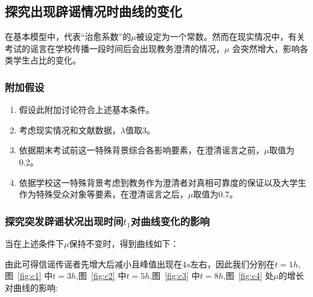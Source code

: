 \documentclass[withoutpreface,bwprint]{cumcmthesis}
\begin{document}
\subsection{探究出现辟谣情况时曲线的变化}
在基本模型中，代表“治愈系数”的$\mu$被设定为一个常数。然而在现实情况中，有关考试的谣言在学校传播一段时间后会出现教务澄清的情况，$\mu$ 会突然增大，影响各类学生占比的变化。
\subsubsection{附加假设}
\begin{enumerate}
	\item 假设此附加讨论符合上述基本条件。
	\item 考虑现实情况和文献数据，$\lambda$值取3。
	\item 依据期末考试前这一特殊背景综合各影响要素，在澄清谣言之前，$\mu$取值为0.2。
	\item 依据学校这一特殊背景考虑到教务作为澄清者对真相可靠度的保证以及大学生作为特殊受众对象等要素，在澄清谣言之后，$\mu$取值为0.7。
\end{enumerate}

\subsubsection{探究突发辟谣状况出现时间$t_1$对曲线变化的影响}
当在上述条件下$\mu$保持不变时，得到曲线如下：

由此可得信谣传谣者先增大后减小且峰值出现在$4s$左右，因此我们分别在$t = 1h$,图~\ref{fig:c1} 中$t = 3h$,图~\ref{fig:c2} 中$t = 5h$,图~\ref{fig:c3} 中$t = 8h$,图~\ref{fig:c4} 处$\mu$的增长对曲线的影响:
\end{document}
